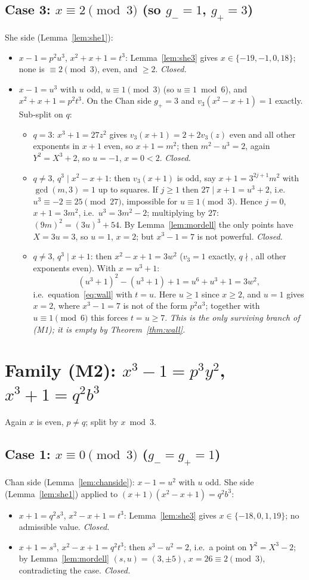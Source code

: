 \documentclass[11pt]{article}
\theoremstyle{remark}
\newcommand{\vp}{v}
\begin{document}
\subsection*{Case 3: $x\equiv2\pmod3$ (so $g_-=1$, $g_+=3$)}
She side (Lemma~\ref{lem:she1}):
\begin{itemize}
\item[(ii)] $x-1=p^2u^3$, $x^2+x+1=t^3$: Lemma~\ref{lem:she3} gives $x\in\{-19,-1,0,18\}$; none is $\equiv2\pmod 3$, even, and $\ge2$. \emph{Closed.}
\item[(i)] $x-1=u^3$ with $u$ odd, $u\equiv1\pmod3$ (so $u\equiv1\bmod 6$), and $x^2+x+1=p^2t^3$. On the Chan side $g_+=3$ and $\vp_3(x^2-x+1)=1$ exactly. Sub-split on $q$:
  \begin{itemize}
  \item $q=3$: $x^3+1=27z^2$ gives $\vp_3(x+1)=2+2\vp_3(z)$ even and all other exponents in $x+1$ even, so $x+1=m^2$; then $m^2-u^3=2$, again $Y^2=X^3+2$, so $u=-1$, $x=0<2$. \emph{Closed.}
  \item $q\neq3$, $q^3\mid x^2-x+1$: then $\vp_3(x+1)$ is odd, say $x+1=3^{2j+1}m^2$ with $\gcd(m,3)=1$ up to squares. If $j\ge1$ then $27\mid x+1=u^3+2$, i.e.\ $u^3\equiv-2\equiv25\pmod{27}$, impossible for $u\equiv1\pmod3$. Hence $j=0$, $x+1=3m^2$, i.e.\ $u^3=3m^2-2$; multiplying by $27$: $(9m)^2=(3u)^3+54$. By Lemma~\ref{lem:mordell} the only points have $X=3u=3$, so $u=1$, $x=2$; but $x^3-1=7$ is not powerful. \emph{Closed.}
  \item $q\neq3$, $q^3\mid x+1$: then $x^2-x+1=3w^2$ ($\vp_3=1$ exactly, $q\nmid$, all other exponents even). With $x=u^3+1$:
  \[
  (u^3+1)^2-(u^3+1)+1=u^6+u^3+1=3w^2,
  \]
  i.e.\ equation~\eqref{eq:wall} with $t=u$. Here $u\ge1$ since $x\ge2$, and $u=1$ gives $x=2$, where $x^3-1=7$ is not of the form $p^2a^3$; together with $u\equiv1\pmod 6$ this forces $t=u\ge7$. \emph{This is the only surviving branch of (M1); it is empty by Theorem~\ref{thm:wall}.}
  \end{itemize}
\end{itemize}

\section{Family (M2): $x^3-1=p^3y^2$, $x^3+1=q^2b^3$}\label{sec:M2}

Again $x$ is even, $p\neq q$; split by $x\bmod3$.

\subsection*{Case 1: $x\equiv0\pmod3$ ($g_-=g_+=1$)}
Chan side (Lemma~\ref{lem:chanside}): $x-1=u^2$ with $u$ odd. She side (Lemma~\ref{lem:she1}) applied to $(x+1)(x^2-x+1)=q^2b^3$:
\begin{itemize}
\item[(b)] $x+1=q^2s^3$, $x^2-x+1=t^3$: Lemma~\ref{lem:she3} gives $x\in\{-18,0,1,19\}$; no admissible value. \emph{Closed.}
\item[(a)] $x+1=s^3$, $x^2-x+1=q^2t^3$: then $s^3-u^2=2$, i.e.\ a point on $Y^2=X^3-2$; by Lemma~\ref{lem:mordell} $(s,u)=(3,\pm5)$, $x=26\equiv2\pmod 3$, contradicting the case. \emph{Closed.}
\end{itemize}
\end{document}
